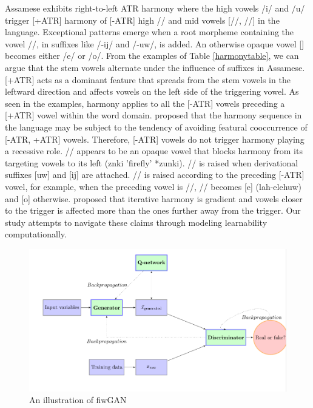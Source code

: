 \documentclass{Interspeech2024}
\begin{document}
Assamese exhibits right-to-left ATR harmony where the high vowels /i/ and /u/ trigger [+ATR] harmony of [-ATR] high /\textupsilon/ and mid vowels [/\textepsilon/, /\textopeno/] in the language. Exceptional patterns emerge when a root morpheme containing the vowel /\textscripta/, in suffixes like /-ij\textscripta/ and /-uw\textscripta/, is added. An otherwise opaque vowel [\textscripta] becomes either /e/ or /o/.  From the examples of Table \ref{harmonytable}, we can argue that the stem vowels alternate under the influence of suffixes in Assamese. [+ATR] acts as a dominant feature that spreads from the stem vowels in the leftward direction and affects vowels on the left side of the triggering vowel. As seen in the examples, harmony applies to all the [-ATR] vowels preceding a [+ATR] vowel within the word domain.\cite{mahanta_directionality_2008} proposed that the harmony sequence in the language may be subject to the tendency of avoiding featural cooccurrence of [-ATR, +ATR] vowels. Therefore, [-ATR] vowels do not trigger harmony playing a recessive role. /\textscripta/ appears to be an opaque vowel that blocks harmony from its targeting vowels to its left (z\textupsilon n\textscripta ki 'firefly' *zun\textscripta ki). /\textscripta/ is raised when derivational suffixes [uw\textscripta] and [ij\textscripta] are attached. /\textscripta/ is raised according to the preceding [-ATR] vowel, for example, when the preceding vowel is /\textepsilon/, /\textscripta/ becomes [e] (\textepsilon lah-elehuw\textscripta) and [o] otherwise. \cite{archangeli_assamese_2020} proposed that iterative harmony is gradient and vowels closer to the trigger is affected more than the ones further away from the trigger. Our study attempts to navigate these claims through modeling learnability computationally.

\begin{figure}
    \centering
    \includegraphics[width=1\linewidth]{fiwGAN.png}
    \caption{An illustration of fiwGAN}
    \label{fig:enter-label}
\end{figure}
\end{document}
